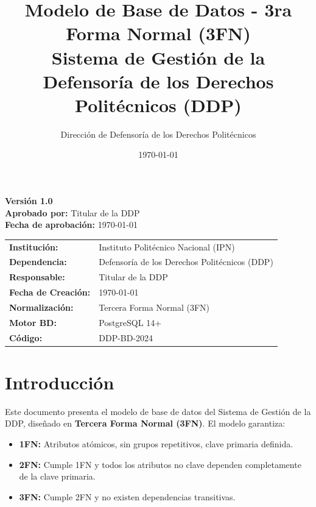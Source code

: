 \documentclass[12pt, a4paper]{article}
\title{\textbf{Modelo de Base de Datos - 3ra Forma Normal (3FN)} \\
\large Sistema de Gestión de la Defensoría de los Derechos Politécnicos (DDP)}
\author{Dirección de Defensoría de los Derechos Politécnicos}
\date{\today}
\begin{document}
\maketitle

\begin{center}
    \textbf{Versión 1.0} \\
    \vspace{0.5cm}
    \textbf{Aprobado por:} Titular de la DDP \\
    \textbf{Fecha de aprobación:} \today
\end{center}

\vspace{1cm}

\begin{tcolorbox}[title=Información del Documento, colback=blue!5!white]
    \begin{tabular}{ll}
        \textbf{Institución:} & Instituto Politécnico Nacional (IPN) \\
        \textbf{Dependencia:} & Defensoría de los Derechos Politécnicos (DDP) \\
        \textbf{Responsable:} & Titular de la DDP \\
        \textbf{Fecha de Creación:} & \today \\
        \textbf{Normalización:} & Tercera Forma Normal (3FN) \\
        \textbf{Motor BD:} & PostgreSQL 14+ \\
        \textbf{Código:} & DDP-BD-2024 \\
    \end{tabular}
\end{tcolorbox}

\section*{Introducción}
Este documento presenta el modelo de base de datos del Sistema de Gestión de la DDP, diseñado en \textbf{Tercera Forma Normal (3FN)}. 
El modelo garantiza:

\begin{itemize}[leftmargin=*]
    \item \textbf{1FN:} Atributos atómicos, sin grupos repetitivos, clave primaria definida.
    \item \textbf{2FN:} Cumple 1FN y todos los atributos no clave dependen completamente de la clave primaria.
    \item \textbf{3FN:} Cumple 2FN y no existen dependencias transitivas.
\end{itemize}
\end{document}
